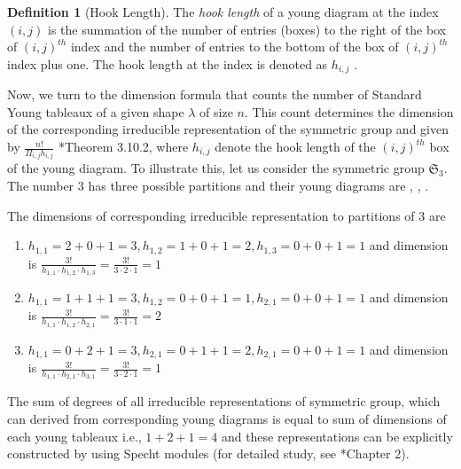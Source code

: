 \documentclass[oneside]{amsart}
\theoremstyle{plain}
\theoremstyle{definition}
\newtheorem{definition}[theorem]{Definition} %
\theoremstyle{remark}
\begin{document}
    \begin{definition}[Hook Length]
        The \emph{hook length} of a young diagram at the index $(i, j)$ is the summation of the number of entries (boxes) to the right of the box of $(i, j)^{th}$ index and the number of entries to the bottom of the box of $(i, j)^{th}$ index plus one. The hook length at the index is denoted as $h_{i,j}$
        .
    \end{definition}
    Now, we turn to the dimension formula that counts the number of Standard Young tableaux of a given shape $\lambda$ of size $n$. This count determines the dimension of the corresponding irreducible representation of the symmetric group and given by $\frac{n!}{\Pi_{i, j}h_{i, j}}$ \cite{MR1824028}*{Theorem 3.10.2}, where $h_{i,j}$ denote the hook length of the $(i,j)^{th}$ box of the young diagram. To illustrate this, let us consider the symmetric group $\mathfrak{S}_3$. The number $3$ has three possible partitions and their young diagrams are
    , , .

    The dimensions of corresponding irreducible representation to partitions of $3$ are 
    \begin{enumerate}
        \item \begin{center}
        \end{center}
    $h_{1,1} = 2 + 0 + 1 = 3, h_{1, 2} = 1 + 0 + 1 = 2, h_{1, 3} = 0 + 0 + 1 = 1$ and dimension is  $\frac{3!}{h_{1, 1}\cdot h_{1,2}\cdot h_{1, 3}} = \frac{3!}{3\cdot 2 \cdot 1} = 1$
    \item \begin{center}
    \end{center}
    $h_{1,1} = 1 + 1 + 1 = 3, h_{1, 2} = 0 + 0 + 1 = 1, h_{2, 1} = 0 + 0 + 1 = 1$ and dimension is $\frac{3!}{h_{1, 1}\cdot h_{1,2}\cdot h_{2, 1}} = \frac{3!}{3\cdot 1 \cdot 1} = 2$
    \item \begin{center}
    \end{center}
    $h_{1,1} = 0 + 2 + 1 = 3, h_{2, 1} = 0 + 1 + 1 = 2, h_{2, 1} = 0 + 0 + 1 = 1$ and dimension is $\frac{3!}{h_{1, 1}\cdot h_{2,1}\cdot h_{3, 1}} = \frac{3!}{3\cdot 2 \cdot 1} = 1$
    \end{enumerate}
    
    
     The sum of degrees of all irreducible representations of symmetric group, which can derived from corresponding young diagrams is equal to sum of dimensions of each young tableaux i.e., $1 + 2 + 1 = 4$ and these representations can be explicitly constructed by using Specht modules (for detailed study, see \cite{MR1824028}*{Chapter 2}). 
\end{document}
